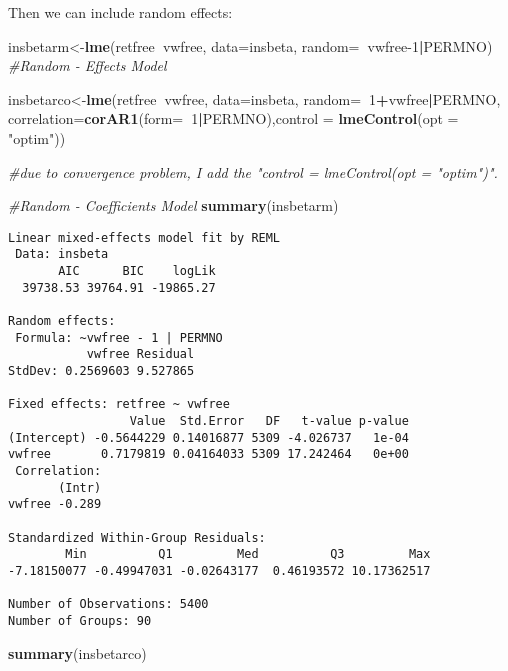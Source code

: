 \documentclass[]{book}
\newenvironment{Shaded}{\begin{snugshade}}{\end{snugshade}}
\newcommand{\CommentTok}[1]{\textcolor[rgb]{0.56,0.35,0.01}{\textit{#1}}}
\newcommand{\DataTypeTok}[1]{\textcolor[rgb]{0.13,0.29,0.53}{#1}}
\newcommand{\DecValTok}[1]{\textcolor[rgb]{0.00,0.00,0.81}{#1}}
\newcommand{\KeywordTok}[1]{\textcolor[rgb]{0.13,0.29,0.53}{\textbf{#1}}}
\newcommand{\NormalTok}[1]{#1}
\newcommand{\OperatorTok}[1]{\textcolor[rgb]{0.81,0.36,0.00}{\textbf{#1}}}
\newcommand{\StringTok}[1]{\textcolor[rgb]{0.31,0.60,0.02}{#1}}
\begin{document}
Then we can include random effects:

\begin{Shaded}
\begin{Highlighting}[]
\NormalTok{insbetarm<-}\KeywordTok{lme}\NormalTok{(retfree}\OperatorTok{~}\NormalTok{vwfree, }\DataTypeTok{data=}\NormalTok{insbeta, }\DataTypeTok{random=}\OperatorTok{~}\NormalTok{vwfree}\DecValTok{-1}\OperatorTok{|}\NormalTok{PERMNO) }\CommentTok{#Random - Effects Model}

\NormalTok{insbetarco<-}\KeywordTok{lme}\NormalTok{(retfree}\OperatorTok{~}\NormalTok{vwfree, }\DataTypeTok{data=}\NormalTok{insbeta, }\DataTypeTok{random=}\OperatorTok{~}\DecValTok{1}\OperatorTok{+}\NormalTok{vwfree}\OperatorTok{|}\NormalTok{PERMNO, }\DataTypeTok{correlation=}\KeywordTok{corAR1}\NormalTok{(}\DataTypeTok{form=}\OperatorTok{~}\DecValTok{1}\OperatorTok{|}\NormalTok{PERMNO),}\DataTypeTok{control =} \KeywordTok{lmeControl}\NormalTok{(}\DataTypeTok{opt =} \StringTok{"optim"}\NormalTok{))}

\CommentTok{#due to convergence problem, I add the "control = lmeControl(opt = "optim")".}

\CommentTok{#Random - Coefficients Model}
\KeywordTok{summary}\NormalTok{(insbetarm)}
\end{Highlighting}
\end{Shaded}

\begin{verbatim}
Linear mixed-effects model fit by REML
 Data: insbeta 
       AIC      BIC    logLik
  39738.53 39764.91 -19865.27

Random effects:
 Formula: ~vwfree - 1 | PERMNO
           vwfree Residual
StdDev: 0.2569603 9.527865

Fixed effects: retfree ~ vwfree 
                 Value  Std.Error   DF   t-value p-value
(Intercept) -0.5644229 0.14016877 5309 -4.026737   1e-04
vwfree       0.7179819 0.04164033 5309 17.242464   0e+00
 Correlation: 
       (Intr)
vwfree -0.289

Standardized Within-Group Residuals:
        Min          Q1         Med          Q3         Max 
-7.18150077 -0.49947031 -0.02643177  0.46193572 10.17362517 

Number of Observations: 5400
Number of Groups: 90 
\end{verbatim}

\begin{Shaded}
\begin{Highlighting}[]
\KeywordTok{summary}\NormalTok{(insbetarco)}
\end{Highlighting}
\end{Shaded}
\end{document}
